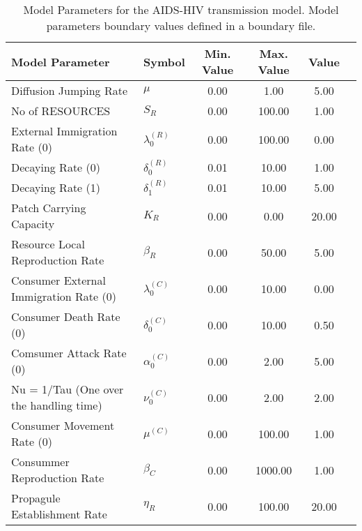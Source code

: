 \begin{table}
\centering
\begin{tabular}{p{5cm}lcccc}
{\bf Model Parameter} & {\bf Symbol} & {\bf Min. Value} & {\bf Max. Value} & {\bf Value}\\
\hline\hline
Diffusion Jumping Rate & $\mu$ & 0.00 & 1.00 & 5.00\\
No of RESOURCES & $S_R$ & 0.00 & 100.00 & 1.00\\
External Immigration Rate (0) & $\lambda^{(R)}_0$ & 0.00 & 100.00 & 0.00\\
Decaying Rate (0) & $\delta^{(R)}_0$ & 0.01 & 10.00 & 1.00\\
Decaying Rate (1) & $\delta^{(R)}_1$ & 0.01 & 10.00 & 5.00\\
Patch Carrying Capacity & $K_R$ & 0.00 & 0.00 & 20.00\\
Resource Local Reproduction Rate & $\beta_R$ & 0.00 & 50.00 & 5.00\\
Consumer External Immigration Rate (0) & $\lambda^{(C)}_0$ & 0.00 & 10.00 & 0.00\\
Consumer Death Rate (0) & $\delta^{(C)}_0$ & 0.00 & 10.00 & 0.50\\
Comsumer Attack Rate (0) & $\alpha^{(C)}_0$ & 0.00 & 2.00 & 5.00\\
Nu = 1/Tau (One over the handling time) & $\nu^{(C)}_0$ & 0.00 & 2.00 & 2.00\\
Consumer Movement Rate (0) & $\mu^{(C)}$ & 0.00 & 100.00 & 1.00\\
Consummer Reproduction Rate & $\beta_C$ & 0.00 & 1000.00 & 1.00\\
Propagule Establishment Rate & $\eta_R$ & 0.00 & 100.00 & 20.00\\
\hline\hline
\end{tabular}
\caption{Model Parameters for the AIDS-HIV transmission model. Model parameters boundary values defined in a boundary file.}
\end{table}
